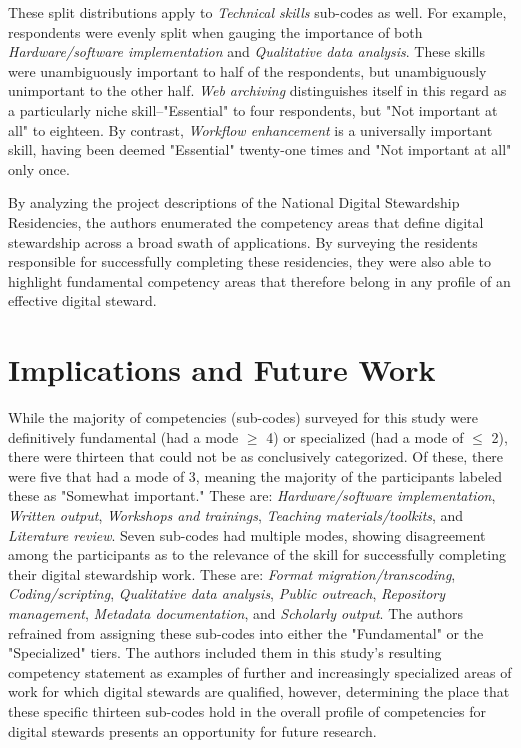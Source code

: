 \documentclass{acm_proc_article-sp}
\begin{document}
These split distributions apply to \textit{Technical skills} sub-codes as well. For example, respondents were evenly split when gauging the importance of both \textit{Hardware/software implementation} and \textit{Qualitative data analysis}. These skills were unambiguously important to half of the respondents, but unambiguously unimportant to the other half. \textit{Web archiving} distinguishes itself in this regard as a particularly niche skill--"Essential" to four respondents, but "Not important at all" to eighteen. By contrast, \textit{Workflow enhancement} is a universally important skill, having been deemed "Essential" twenty-one times and "Not important at all" only once.   

By analyzing the project descriptions of the National Digital Stewardship Residencies, the authors enumerated the competency areas that define digital stewardship across a broad swath of applications. By surveying the residents responsible for successfully completing these residencies, they were also able to highlight fundamental competency areas that therefore belong in any profile of an effective digital steward.

\section{Implications and Future Work}
While the majority of competencies (sub-codes) surveyed for this study were definitively fundamental (had a mode $\geq$ 4) or specialized (had a mode of $\leq$ 2), there were thirteen that could not be as conclusively categorized. Of these, there were five that had a mode of 3, meaning the majority of the participants labeled these as "Somewhat important." These are: \textit{Hardware/software implementation}, \textit{Written output}, \textit{Workshops and trainings}, \textit{Teaching materials/toolkits}, and \textit{Literature review}. Seven sub-codes had multiple modes, showing disagreement among the participants as to the relevance of the skill for successfully completing their digital stewardship work. These are: \textit{Format migration/transcoding}, \textit{Coding/scripting}, \textit{Qualitative data analysis}, \textit{Public outreach}, \textit{Repository management}, \textit{Metadata documentation}, and \textit{Scholarly output}. The authors refrained from assigning these sub-codes into either the "Fundamental" or the "Specialized" tiers. The authors included them in this study's resulting competency statement as examples of further and increasingly specialized areas of work for which digital stewards are qualified, however, determining the place that these specific thirteen sub-codes hold in the overall profile of competencies for digital stewards presents an opportunity for future research.
\end{document}
